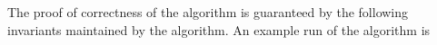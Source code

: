 \documentclass[envcountsect, envcountsame, 11pt]{../lib/llncs2e/llncs}
\def\cO{{\cal O}}
\def\cl{\mathpzc{l}}
\begin{document}
%
The proof of correctness of the algorithm is guaranteed by the following invariants maintained by the algorithm.  An example run of the algorithm is 
\end{document}
